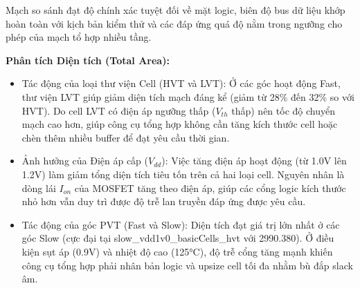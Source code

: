 \documentclass[12pt,a4paper,oneside]{book}
\begin{document}
Mạch so sánh đạt độ chính xác tuyệt đối về mặt logic, biên độ bus dữ liệu khớp hoàn toàn với kịch bản kiểm thử và các đáp ứng quá độ nằm trong ngưỡng cho phép của mạch tổ hợp nhiều tầng.
\begin{table}[H]
\centering
{}
\caption{Tổng hợp thông số Diện tích và Công suất của khối Min/Submin Calculationn qua các process corners.}
\end{table}

\textbf{Phân tích Diện tích (Total Area):}
\begin{itemize}
    \item Tác động của loại thư viện Cell (HVT và LVT): Ở các góc hoạt động Fast, thư viện LVT giúp giảm diện tích mạch đáng kể (giảm từ 28\% đến 32\% so với HVT). Do cell LVT có điện áp ngưỡng thấp ($V_{th}$ thấp) nên tốc độ chuyển mạch cao hơn, giúp công cụ tổng hợp không cần tăng kích thước cell hoặc chèn thêm nhiều buffer để đạt yêu cầu thời gian.
    \item Ảnh hưởng của Điện áp cấp ($V_{dd}$): Việc tăng điện áp hoạt động (từ 1.0V lên 1.2V) làm giảm tổng diện tích tiêu tốn trên cả hai loại cell. Nguyên nhân là dòng lái $I_{on}$ của MOSFET tăng theo điện áp, giúp các cổng logic kích thước nhỏ hơn vẫn duy trì được độ trễ lan truyền đáp ứng được yêu cầu.
    \item Tác động của góc PVT (Fast và Slow): Diện tích đạt giá trị lớn nhất ở các góc Slow (cực đại tại slow\_vdd1v0\_basicCells\_hvt với 2990.380). Ở điều kiện sụt áp (0.9V) và nhiệt độ cao (125°C), độ trễ cổng tăng mạnh khiến công cụ tổng hợp phải nhân bản logic và upsize cell tối đa nhằm bù đắp slack âm.
\end{itemize}
\end{document}
